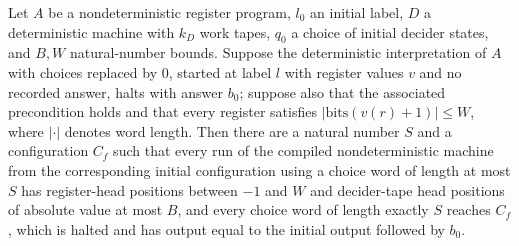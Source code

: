 \begin{theorem}
\label{Complexity.LogProg.ndet_halt}
\leanok
{}
Let $A$ be a nondeterministic register program, $l_0$ an initial label, $D$ a
deterministic machine with $k_D$ work tapes, $q_0$ a choice of initial decider states,
and $B,W$ natural-number bounds. Suppose the deterministic interpretation of $A$ with
choices replaced by $0$, started at label $l$ with register values $v$ and no recorded
answer, halts with answer $b_0$; suppose also that the associated precondition holds and
that every register satisfies $|\mathrm{bits}(v(r)+1)|\le W$, where $|\cdot|$ denotes
word length. Then there are a natural number $S$ and a configuration $C_f$ such that
every run of the compiled nondeterministic machine from the corresponding initial
configuration using a choice word of length at most $S$ has register-head positions
between $-1$ and $W$ and decider-tape head positions of absolute value at most $B$, and
every choice word of length exactly $S$ reaches $C_f$, which is halted and has output
equal to the initial output followed by $b_0$.
\end{theorem}
